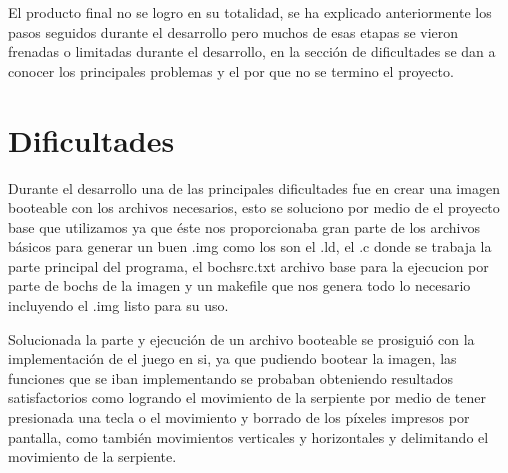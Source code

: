\documentclass[twocolumn,11pts]{IEEEtran}
\begin{document}
    El producto final no se logro en su totalidad, se ha explicado anteriormente los pasos seguidos durante el desarrollo pero muchos de esas etapas se vieron frenadas o limitadas durante el desarrollo, en la sección de dificultades se dan a conocer los principales problemas y el por que no se termino el proyecto.  

\section{Dificultades}
Durante el desarrollo una de las principales dificultades fue en crear una imagen booteable con los archivos necesarios, esto se soluciono por medio de el proyecto\cite{psycho} base que utilizamos ya que éste nos proporcionaba gran parte de los archivos básicos para generar un buen .img como los son el .ld, el .c donde se trabaja la parte principal del programa, el bochsrc.txt archivo base para la ejecucion por parte de bochs de la imagen y un makefile que nos genera todo lo necesario incluyendo el .img listo para su uso.

    Solucionada la parte y ejecución de un archivo booteable se prosiguió con la implementación de el juego en si, ya que pudiendo bootear la imagen, las funciones que se iban implementando se probaban obteniendo resultados satisfactorios como logrando el movimiento de la serpiente por medio de tener presionada una tecla o el movimiento y borrado de los píxeles impresos por pantalla, como también movimientos verticales y horizontales y delimitando el movimiento de la serpiente. 
    
\end{document}
